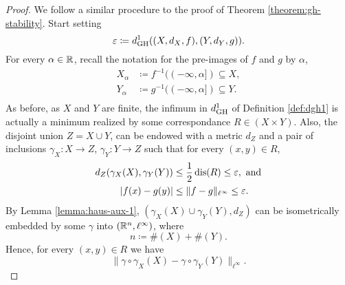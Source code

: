 \begin{proof}
    We follow a similar procedure to the proof of Theorem \ref{theorem:gh-stability}. Start setting
    \begin{equation}
        \varepsilon \coloneq d_{\operatorname{GH}}^1((X, d_X, f), (Y, d_Y, g)).
    \end{equation}
    For every $ \alpha \in \mathbb R $, recall the notation for the pre-images of $ f $ and $ g $ by $ \alpha $,
    \begin{align}
        X_\alpha &\coloneq f^{-1}((-\infty, \alpha]) \subseteq X, \\
        Y_\alpha &\coloneq g^{-1}((-\infty, \alpha]) \subseteq Y. \\
    \end{align}
    As before, as $ X $ and $ Y $ are finite, the infimum in $ d_{\operatorname{GH}}^1 $ of Definition \ref{def:dgh1} is actually a minimum realized by some correspondance $ R \in (X \times Y) $. Also, the disjoint union $ Z = X \cup Y $, can be endowed with a metric $ d_Z $ and a pair of inclusions $ \gamma_X \colon X \to Z $, $ \gamma_Y \colon Y \to Z $ such that for every $ (x, y) \in R $, 
    \begin{align}
        d_Z(\gamma_X(X), \gamma_Y(Y)) &\leq \frac{1}{2} \operatorname{dis}(R) \leq \varepsilon, \text{ and} \\
        |f(x) - g(y)| &\leq \|f-g\|_{\ell^\infty} \leq \varepsilon.
    \end{align}
    By Lemma \ref{lemma:haus-aux-1}, $ (\gamma_X(X) \cup \gamma_Y(Y), d_Z) $ can be isometrically embedded by some $ \gamma $ into $ (\mathbb R^n, \ell^\infty) $, where
    \begin{equation}
        n \coloneq \#(X) + \#(Y).
    \end{equation}
    Hence, for every $ (x, y) \in R $ we have
    \begin{equation}
        \|\gamma \circ \gamma_X(X) - \gamma \circ \gamma_Y(Y) \|_{\ell^\infty}.
    \end{equation}


\end{proof}
